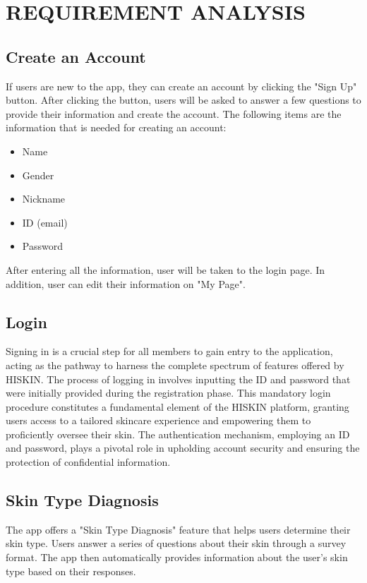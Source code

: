 \documentclass[conference]{IEEEtran}
\begin{document}
\section{REQUIREMENT ANALYSIS}

\subsection{Create an Account}
If users are new to the app, they can create an account by clicking the "Sign Up" button. After clicking the button, users will be asked to answer a few questions to provide their information and create the account. The following items are the information that is needed for creating an account:
\begin{itemize}
    \item Name
    \item Gender
    \item Nickname
    \item ID (email)
    \item Password
\end{itemize}
After entering all the information, user will be taken to the login page. In addition, user can edit their information on "My Page".\\
\subsection{Login}
Signing in is a crucial step for all members to gain entry to the application, acting as the pathway to harness the complete spectrum of features offered by HISKIN. The process of logging in involves inputting the ID and password that were initially provided during the registration phase. This mandatory login procedure constitutes a fundamental element of the HISKIN platform, granting users access to a tailored skincare experience and empowering them to proficiently oversee their skin. The authentication mechanism, employing an ID and password, plays a pivotal role in upholding account security and ensuring the protection of confidential information.\\
\subsection{Skin Type Diagnosis}
The app offers a "Skin Type Diagnosis" feature that helps users determine their skin type. Users answer a series of questions about their skin through a survey format. The app then automatically provides information about the user's skin type based on their responses.\\
\end{document}
